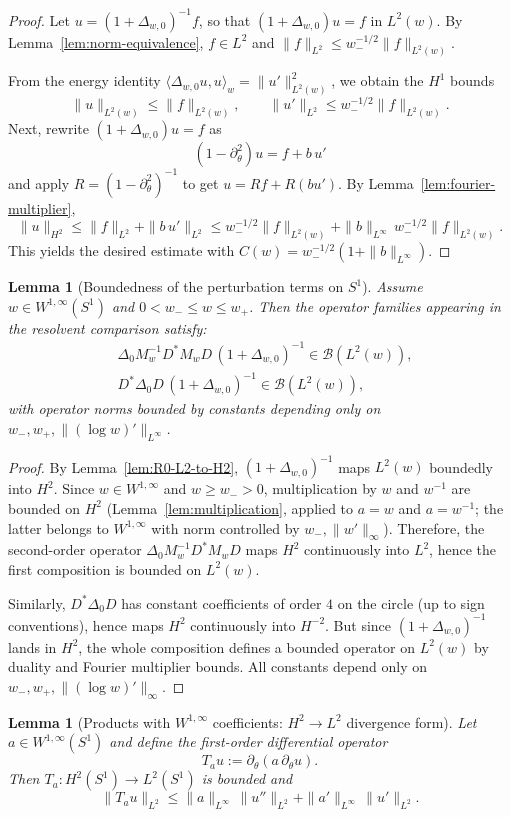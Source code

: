 \documentclass{amsart}
\numberwithin{equation}{section}
\newtheorem{lemma}[theorem]{Lemma}
\theoremstyle{definition}
\theoremstyle{remark}
\begin{document}
\begin{proof}
Let $u=(1+\Delta_{w,0})^{-1}f$, so that $(1+\Delta_{w,0})u=f$ in $L^2(w)$.
By Lemma~\ref{lem:norm-equivalence}, $f\in L^2$ and $\|f\|_{L^2}\le w_-^{-1/2}\|f\|_{L^2(w)}$.

From the energy identity $\langle \Delta_{w,0}u,u\rangle_w=\|u'\|_{L^2(w)}^2$,
we obtain the $H^1$ bounds
\[
\|u\|_{L^2(w)}\le \|f\|_{L^2(w)},\qquad
\|u'\|_{L^2}\le w_-^{-1/2}\|f\|_{L^2(w)}.
\]
Next, rewrite $(1+\Delta_{w,0})u=f$ as
\[
(1-\partial_\theta^2)u = f + b\,u'
\]
and apply $R=(1-\partial_\theta^2)^{-1}$ to get $u=Rf+R(bu')$.
By Lemma~\ref{lem:fourier-multiplier},
\[
\|u\|_{H^2}\le \|f\|_{L^2} + \|b\,u'\|_{L^2}
\le w_-^{-1/2}\|f\|_{L^2(w)} + \|b\|_{L^\infty}\,w_-^{-1/2}\|f\|_{L^2(w)}.
\]
This yields the desired estimate with $C(w)=w_-^{-1/2}(1+\|b\|_{L^\infty})$.
\end{proof}

\begin{lemma}[Boundedness of the perturbation terms on $S^1$]\label{lem:perturbation-boundedness}
Assume $w\in W^{1,\infty}(S^1)$ and $0<w_-\le w\le w_+$.
Then the operator families appearing in the resolvent comparison satisfy:
\begin{align*}
&\Delta_0 M_w^{-1} D^* M_w D\, (1+\Delta_{w,0})^{-1}\in\mathcal B(L^2(w)),\\
&D^*\Delta_0 D\, (1+\Delta_{w,0})^{-1}\in\mathcal B(L^2(w)),
\end{align*}
with operator norms bounded by constants depending only on
$w_-,w_+,\|(\log w)'\|_{L^\infty}$.
\end{lemma}

\begin{proof}
By Lemma~\ref{lem:R0-L2-to-H2}, $(1+\Delta_{w,0})^{-1}$ maps $L^2(w)$ boundedly into $H^2$.
Since $w\in W^{1,\infty}$ and $w\ge w_->0$, multiplication by $w$ and $w^{-1}$
are bounded on $H^2$ (Lemma~\ref{lem:multiplication}, applied to $a=w$ and $a=w^{-1}$;
the latter belongs to $W^{1,\infty}$ with norm controlled by $w_-,\|w'\|_\infty$).
Therefore, the second-order operator $\Delta_0 M_w^{-1} D^* M_w D$
maps $H^2$ continuously into $L^2$, hence the first composition is bounded on $L^2(w)$.

Similarly, $D^*\Delta_0 D$ has constant coefficients of order $4$ on the circle
(up to sign conventions), hence maps $H^2$ continuously into $H^{-2}$.
But since $(1+\Delta_{w,0})^{-1}$ lands in $H^2$, the whole composition defines
a bounded operator on $L^2(w)$ by duality and Fourier multiplier bounds.
All constants depend only on $w_-,w_+,\|(\log w)'\|_\infty$.
\end{proof}
\begin{lemma}[Products with $W^{1,\infty}$ coefficients: $H^2\to L^2$ divergence form]
\label{lem:W1inf-divergence}
Let $a\in W^{1,\infty}(S^1)$ and define the first-order differential operator
\[
T_a u := \partial_\theta(a\,\partial_\theta u).
\]
Then $T_a:H^2(S^1)\to L^2(S^1)$ is bounded and
\begin{equation}\label{eq:Ta-bound}
\|T_a u\|_{L^2}
\le \|a\|_{L^\infty}\,\|u''\|_{L^2}+\|a'\|_{L^\infty}\,\|u'\|_{L^2}.
\end{equation}
\end{lemma}
\end{document}
